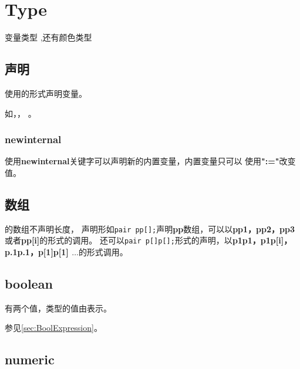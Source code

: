 \chapter{Type}

变量类型
,还有颜色类型

\section{声明}

使用的形式声明变量。\par

如，，%
。

\subsection{newinternal}

使用{\color{blue}\bf newinternal}关键字可以声明新的内置变量，内置变量只可以%
使用{\bf ":="}改变值。

\section{数组}

\mpost 的数组不声明长度，
声明形如\lstinline$pair pp[];$声明{\bf pp}数组，可以以{\bf pp1，pp2，pp3}%
或者{\bf pp[i]}的形式的调用。
还可以\lstinline$pair p[]p[];$形式的声明，以{\bf p1p1，p1p[i]，p.1p.1，p[1]p[1] $\dots$}的形式调用。

\section{boolean}

有两个值，类型的值由表示。\par
{}参见\ref{sec:BoolExpression}。

\section{numeric}
\label{type:numeric}

